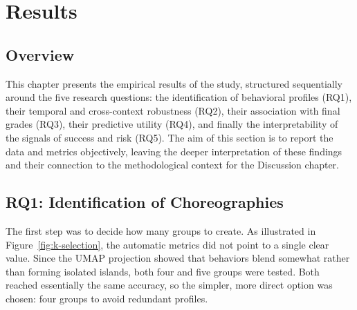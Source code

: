 \chapter{Results}
\label{chap:results}


\section{Overview}
\label{sec:results-overview}
This chapter presents the empirical results of the study, structured sequentially around the five research questions: the identification of behavioral profiles (RQ1), their temporal and cross-context robustness (RQ2), their association with final grades (RQ3), their predictive utility (RQ4), and finally the interpretability of the signals of success and risk (RQ5). The aim of this section is to report the data and metrics objectively, leaving the deeper interpretation of these findings and their connection to the methodological context for the Discussion chapter.

\section{RQ1: Identification of Choreographies}
\label{sec:rq1-results}
%
%
The first step was to decide how many groups to create. As illustrated in Figure~\ref{fig:k-selection}, the automatic metrics did not point to a single clear value. Since the UMAP projection showed that behaviors blend somewhat rather than forming isolated islands, both four and five groups were tested. Both reached essentially the same accuracy, so the simpler, more direct option was chosen: four groups to avoid redundant profiles.

